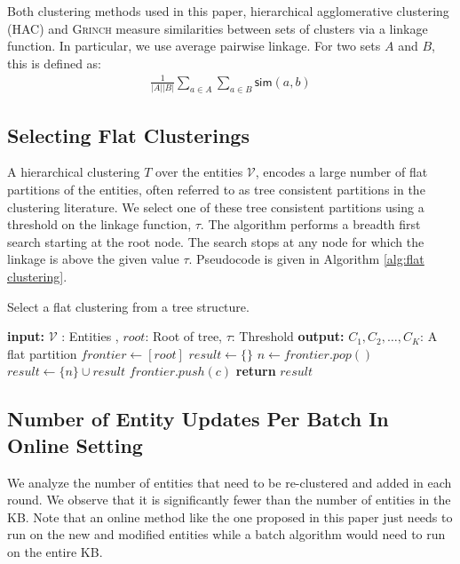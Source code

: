 \documentclass[11pt,a4paper]{article}
\begin{document}
Both clustering methods used in this paper, 
hierarchical agglomerative clustering (HAC) and
\textsc{Grinch} measure similarities between sets 
of clusters via a linkage function. In particular, 
we use average pairwise linkage. For two sets $A$ and $B$,
this is defined as:
\begin{align}
    \frac{1}{|A||B|} \sum_{a \in A} \sum_{a \in B} \textsf{sim}(a,b)
\end{align}

\subsection{Selecting Flat Clusterings}
\label{sub:appendix_flat_cluster}
A hierarchical clustering $T$ over the entities $\mathcal{V}$,
encodes a large number of flat partitions of the entities, 
often referred to as tree consistent partitions in the clustering 
literature. We select one of these tree consistent partitions 
using a threshold on the linkage function, $\tau$. The algorithm performs 
a breadth first search starting at the root node. The search stops
at any node for which the linkage is above the given value $\tau$. 
Pseudocode is given in Algorithm \ref{alg:flat clustering}.

\begin{algorithm}[t]
\caption{Select a flat clustering from a tree structure.}
\begin{algorithmic}[1]
\State \textbf{input:} {$\mathcal{V}$ : Entities , $root$: Root of tree, $\tau$: Threshold}
\State \textbf{output:} {$C_1,C_2,\dots,C_K$: A flat partition}
\State $frontier \gets [root]$
\State $result \gets \{\}$
\State $n \gets frontier.pop()$
\State $result \gets \{n\} \cup result$
\ELSE
{}
\State $frontier.push(c)$
\ENDFOR
\ENDIF
\ENDWHILE
\State \textbf{return} $result$
\end{algorithmic}
\label{alg:flat clustering}
\end{algorithm}

\subsection{Number of Entity Updates Per Batch In Online Setting}

We analyze the number of entities that need to be re-clustered and
added in each round. We observe that it is significantly fewer 
than the number of entities in the KB. Note that an online method like
the one proposed in this paper just needs to run on the new and modified 
entities while a batch algorithm would need to run on the entire KB.
\end{document}
